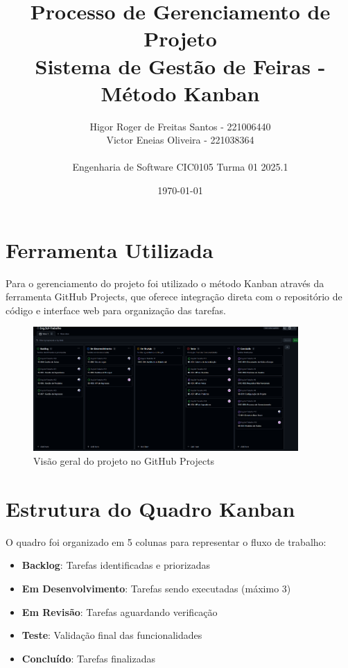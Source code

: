 \documentclass[12pt,a4paper]{article}
\title{\textbf{Processo de Gerenciamento de Projeto}\\
\large Sistema de Gestão de Feiras - Método Kanban}
\author{Higor Roger de Freitas Santos - 221006440\\
Victor Eneias Oliveira - 221038364\\
\\
Engenharia de Software CIC0105 Turma 01 2025.1}
\date{\today}
\begin{document}
\maketitle

\section{Ferramenta Utilizada}

Para o gerenciamento do projeto foi utilizado o método Kanban através da ferramenta GitHub Projects, que oferece integração direta com o repositório de código e interface web para organização das tarefas.

\begin{figure}[h]
    \centering
    \includegraphics[width=0.9\textwidth]{processo/visao_geral_projeto.png}
    \caption{Visão geral do projeto no GitHub Projects}
    \label{fig:visao_geral}
\end{figure}

\section{Estrutura do Quadro Kanban}

O quadro foi organizado em 5 colunas para representar o fluxo de trabalho:

\begin{itemize}
    \item \textbf{Backlog}: Tarefas identificadas e priorizadas
    \item \textbf{Em Desenvolvimento}: Tarefas sendo executadas (máximo 3)
    \item \textbf{Em Revisão}: Tarefas aguardando verificação
    \item \textbf{Teste}: Validação final das funcionalidades
    \item \textbf{Concluído}: Tarefas finalizadas
\end{itemize}
\end{document}
